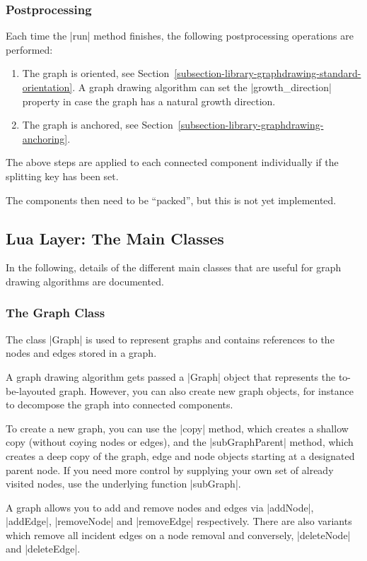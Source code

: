 \subsubsection{Postprocessing}

Each time the |run| method finishes, the following postprocessing
operations are performed:
\begin{enumerate}
\item The graph is oriented, see
  Section~\ref{subsection-library-graphdrawing-standard-orientation}. A
  graph drawing algorithm can set the |growth_direction| property in
  case the graph has a natural growth direction.
\item The graph is anchored, see
  Section~\ref{subsection-library-graphdrawing-anchoring}. 
\end{enumerate}
The above steps are applied to each connected component individually
if the splitting key has been set.

The components then need to be ``packed'', but this is not yet
implemented.




\subsection{Lua Layer: The Main Classes}

In the following, details of the different main classes that are
useful for graph drawing algorithms are documented.


\subsubsection{The Graph Class}

The class |Graph| is used to represent graphs and contains
references to the nodes and edges stored in a graph.

A graph drawing algorithm gets passed a |Graph| object that represents
the to-be-layouted graph. However, you can also create new graph
objects, for instance to decompose the graph into connected
components. 

To create a new graph, you can use the |copy| method, which creates a 
shallow copy (without coying nodes or edges), and the
|subGraphParent| method, which creates a deep copy of the graph, edge
and node objects starting at a designated parent node. If you need
more control by supplying your own set of already visited nodes, use
the underlying function |subGraph|.

A graph allows you to add and remove nodes and edges via |addNode|,
|addEdge|, |removeNode| and |removeEdge| respectively.  There are also
variants which remove all incident edges on a node removal and
conversely, |deleteNode| and |deleteEdge|.

